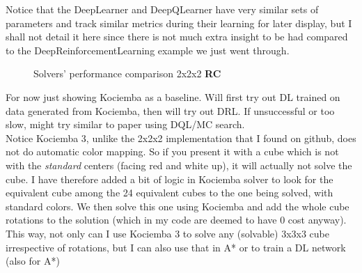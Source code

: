 Notice that the DeepLearner and DeepQLearner have very similar sets of parameters and track similar metrics during their learning for later display, but I shall not detail it here since there is not much extra insight to be had compared to the DeepReinforcementLearning example we just went through.







\begin{figure}[H]
  \noindent
  \caption[222RCPerformance]{Solvers' performance comparison 2x2x2 \textbf{RC}}
  \label{fig:222RCPerformance}
\end{figure}



\label{sec:ResRubiks333}

For now just showing Kociemba as a baseline. Will first try out DL trained on data generated from Kociemba, then will try out DRL. If unsuccessful or too slow, might try similar to paper using DQL/MC search.
\\
Notice Kociemba 3, unlike the 2x2x2 implementation that I found on github, does not do automatic color mapping. So if you present it with a cube which is not with the \textit{standard} centers (facing red and white up), it will actually not solve the cube. I have therefore added a bit of logic in Kociemba solver to look for the equivalent cube among the 24 equivalent cubes to the one being solved, with standard colors. We then solve this one using Kociemba and add the whole cube rotations to the solution (which in my code are deemed to have 0 cost anyway). This way, not only can I use Kociemba 3 to solve any (solvable) 3x3x3 cube irrespective of rotations, but I can also use that in A* or to train a DL network (also for A*)




